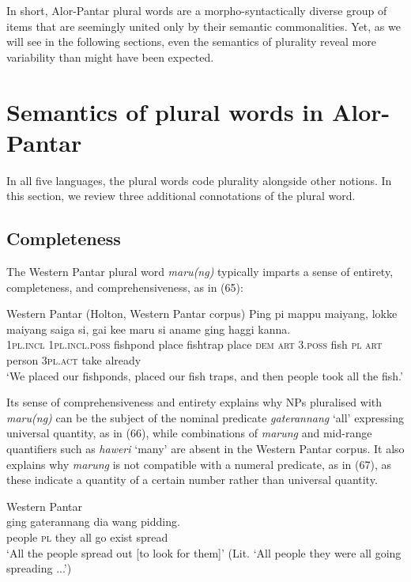  In short, Alor-Pantar plural words are a morpho-syntactically diverse group of items that are seemingly united only by their semantic commonalities. Yet, as we will see in the following sections, even the semantics of plurality reveal more variability than might have been expected.

\section{Semantics of plural words in Alor-Pantar}  %
In all five languages, the plural words code plurality alongside other notions. In this section, we review three additional connotations of the plural word.

\subsection{Completeness} %
The Western Pantar plural word \textit{maru(ng)} typically imparts a sense of entirety, completeness, and comprehensiveness, as in (65):


\ea%
\label{ex:65}
Western Pantar (Holton, Western Pantar corpus)
\gll  Ping pi mappu maiyang, lokke maiyang saiga si, gai ke{{\textglotstop}}{e} maru si aname ging haggi kanna. \\
    \textsc{1pl.incl}  \textsc{1pl.incl.poss} fishpond place fishtrap place \textsc{dem} \textsc{art}  \textsc{3.poss} fish \textsc{pl} \textsc{art} person \textsc{3pl.act} take already \\
\glt `We placed our fishponds, placed our fish traps,  and then people took all the fish.'
\z


Its sense of comprehensiveness and entirety explains why NPs pluralised with \textit{maru(ng)} can be the subject of the nominal predicate \textit{gaterannang} `all' expressing universal quantity, as in (66), while combinations of \textit{marung} and mid-range quantifiers such as \textit{haweri} `many' are absent in the Western Pantar corpus. It also explains why \textit{marung} is not compatible with a numeral predicate, as in (67), as these indicate a quantity of a certain number rather than universal quantity.


\ea%
\label{ex:66}
Western Pantar \citep{Holton2012}\\
 ging gaterannang dia wang pidding. \\
   people \textsc{pl} they all  go exist spread  \\
\glt `All the people spread out [to look for them]' \citep{Holton2012}
(Lit. `All people they were all going spreading ...')
\z









